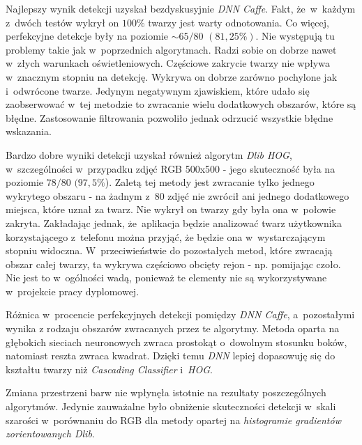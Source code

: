 Najlepszy wynik detekcji uzyskał bezdyskusyjnie \textit{DNN Caffe}. Fakt, że~w~każdym z~dwóch testów wykrył on $100 \%$ twarzy jest warty odnotowania. Co więcej, perfekcyjne detekcje były na poziomie $\sim65/80$ $(81,25 \%)$. Nie występują tu problemy takie jak w~poprzednich algorytmach. Radzi sobie on dobrze nawet w~złych warunkach oświetleniowych. Częściowe zakrycie twarzy nie wpływa w~znacznym stopniu na detekcję. Wykrywa on dobrze zarówno pochylone jak i~odwrócone twarze. Jedynym negatywnym zjawiskiem, które udało się zaobserwować w~tej metodzie to zwracanie wielu dodatkowych obszarów, które są błędne. Zastosowanie filtrowania pozwoliło jednak odrzucić wszystkie błędne wskazania.

\par

Bardzo dobre wyniki detekcji uzyskał również algorytm \textit{Dlib HOG}, w~szczególności w~przypadku zdjęć RGB 500x500 - jego skuteczność była na poziomie $78/80$ $(97,5 \%$). Zaletą tej metody jest zwracanie tylko jednego wykrytego obszaru - na żadnym z~80 zdjęć nie zwrócił ani jednego dodatkowego miejsca, które uznał za twarz. Nie wykrył on twarzy gdy była ona w~połowie zakryta. Zakładając jednak, że~aplikacja będzie analizować twarz użytkownika korzystającego z~telefonu można przyjąć, że będzie ona w~wystarczającym stopniu widoczna. W~przeciwieństwie do pozostałych metod, które zwracają obszar całej twarzy, ta wykrywa częściowo obcięty rejon - np. pomijając czoło. Nie jest to w~ogólności wadą, ponieważ te elementy nie są wykorzystywane w~projekcie pracy dyplomowej.

\vspace{5mm}

Różnica w~procencie perfekcyjnych detekcji pomiędzy \textit{DNN Caffe}, a~pozostałymi wynika z rodzaju obszarów zwracanych przez te algorytmy. Metoda oparta na głębokich sieciach neuronowych zwraca prostokąt o~dowolnym stosunku boków, natomiast reszta zwraca kwadrat. Dzięki temu \textit{DNN} lepiej dopasowuję się do kształtu twarzy niż \textit{Cascading Classifier} i~\textit{HOG}.

\vspace{5mm}

Zmiana przestrzeni barw nie wpłynęła istotnie na rezultaty poszczególnych algorytmów. Jedynie zauważalne było obniżenie skuteczności detekcji w~skali szarości w~porównaniu do RGB dla metody opartej na \textit{histogramie gradientów zorientowanych Dlib}.







